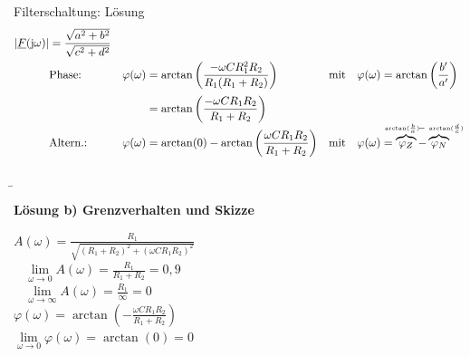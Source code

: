 \begin{frame}[allowframebreaks]
\begin{bsp}{Filterschaltung: Lösung}{}
\begin{align*}
            |\underline{F}(\mathrm{j}\omega)| &= \frac{\sqrt{a^2+b^2}}{\sqrt{c^2+d^2}}\\
        &\text{Phase:}&
            \varphi(\omega) &= \arctan\left(\frac{-\omega C R_1^2R_2}{R_1(R_1+R_2)}\right)&
            &\text{mit}&
            \varphi(\omega) &= \arctan\left(\frac{b'}{a'}\right)\\[+2pt]
        &&
            &= \arctan\left(\frac{-\omega C R_1R_2}{R_1+R_2}\right)\\[-4pt]
        &\text{Altern.:}&
            \varphi(\omega ) &= \arctan(0) - \arctan\left(\frac{\omega CR_1R_2}{R_1+R_2}\right)&
            &\text{mit}&
            \varphi(\omega) &= \overbrace{\varphi_{Z}}^{\mathclap{\scriptscriptstyle{\arctan(\frac{b}{a})}\ \ }} - \overbrace{\varphi_{N}}^{\mathclap{\ -\ \scriptscriptstyle{\arctan(\frac{d}{c})}}}
    \end{align*}

\b{\framebreak}%

\textbf{Lösung b) Grenzverhalten und Skizze}

    \noindent%
    \begin{minipage}{\textwidth}
        \begin{minipage}[c][6cm][c]{0.48\textwidth}

            $A(\omega) = \frac{R_1}{\sqrt{(R_1+R_2)^2+(\omega CR_1R_2)^2}}$ \\

            \qquad $\ \ \ \ \lim \limits_{\omega \to 0} A(\omega) = \frac{R_1}{R_1+R_2} = 0,9$\\
            
            \qquad $\ \ \ \ \lim \limits_{\omega \to \infty} A(\omega) = \frac{R_1}{\infty} = 0$\\
            
            $\varphi(\omega) = \arctan(-\frac{\omega CR_1R_2}{R_1+R_2})$\\

            \qquad $\lim \limits_{\omega \to 0} \varphi(\omega) = \arctan(0) = 0$\\


\end{minipage}
\end{minipage}
\end{bsp}
\end{frame}
